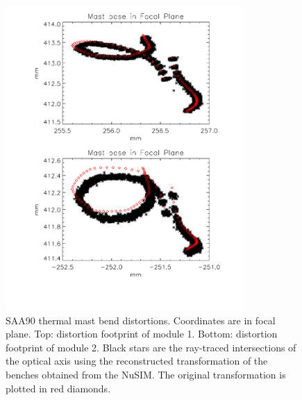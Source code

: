 \begin{figure}[tb]
\begin{center}
\includegraphics[width=0.8\textwidth]{images/saa90mastbend2.pdf}
\caption{SAA90 thermal mast bend distortions. Coordinates are in focal plane. Top: distortion footprint of module 1. Bottom: distortion footprint of module 2. Black stars are the ray-traced intersections of the optical axis using the reconstructed transformation of the benches obtained from the NuSIM. The original transformation is plotted in red diamonds.}
\label{saa90re}
\end{center}
\end{figure}

